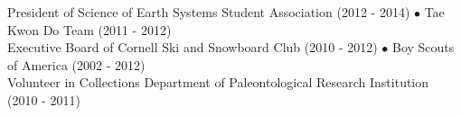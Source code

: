 
President of Science of Earth Systems Student Association (2012 - 2014) $\bullet$ Tae Kwon Do Team (2011 - 2012)\\
Executive Board of Cornell Ski and Snowboard Club (2010 - 2012) $\bullet$ Boy Scouts of America (2002 - 2012)\\
Volunteer in Collections Department of Paleontological Research Institution (2010 - 2011)
